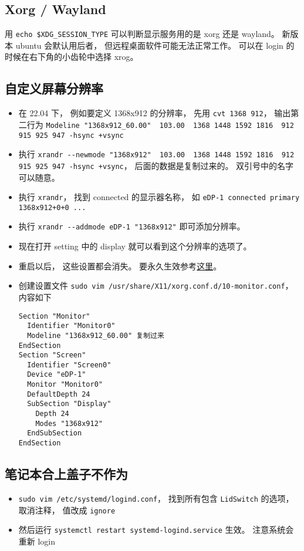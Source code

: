 \subsection{Xorg / Wayland}
用 \verb`echo $XDG_SESSION_TYPE` 可以判断显示服务用的是 xorg 还是 wayland。 新版本 ubuntu 会默认用后者， 但远程桌面软件可能无法正常工作。 可以在 login 的时候在右下角的小齿轮中选择 xrog。

\subsection{自定义屏幕分辨率}
\begin{itemize}
\item 在 22.04 下， 例如要定义 1368x912 的分辨率， 先用 \verb`cvt 1368 912`， 输出第二行为 \verb`Modeline "1368x912_60.00"  103.00  1368 1448 1592 1816  912 915 925 947 -hsync +vsync`
\item 执行 \verb`xrandr --newmode "1368x912"  103.00  1368 1448 1592 1816  912 915 925 947 -hsync +vsync`， 后面的数据是复制过来的。 双引号中的名字可以随意。
\item 执行 \verb`xrandr`， 找到 connected 的显示器名称， 如 \verb`eDP-1 connected primary 1368x912+0+0 ...`
\item 执行 \verb`xrandr --addmode eDP-1 "1368x912"` 即可添加分辨率。
\item 现在打开 setting 中的 display 就可以看到这个分辨率的选项了。
\item 重启以后， 这些设置都会消失。 要永久生效参考\href{https://askubuntu.com/questions/1376391/how-to-permanently-save-an-xrandr-configuration-for-a-monitor-even-after-reboot}{这里}。
\item 创建设置文件 \verb`sudo vim /usr/share/X11/xorg.conf.d/10-monitor.conf`， 内容如下
\begin{lstlisting}[language=none]
Section "Monitor"
  Identifier "Monitor0"
  Modeline "1368x912_60.00" 复制过来
EndSection
Section "Screen"
  Identifier "Screen0"
  Device "eDP-1"
  Monitor "Monitor0"
  DefaultDepth 24
  SubSection "Display"
    Depth 24
    Modes "1368x912"
  EndSubSection
EndSection
\end{lstlisting}
\end{itemize}


\subsection{笔记本合上盖子不作为}
\begin{itemize}
\item \verb`sudo vim /etc/systemd/logind.conf`， 找到所有包含 \verb`LidSwitch` 的选项， 取消注释， 值改成 \verb`ignore`
\item 然后运行 \verb`systemctl restart systemd-logind.service` 生效。 注意系统会重新 login
\end{itemize}

